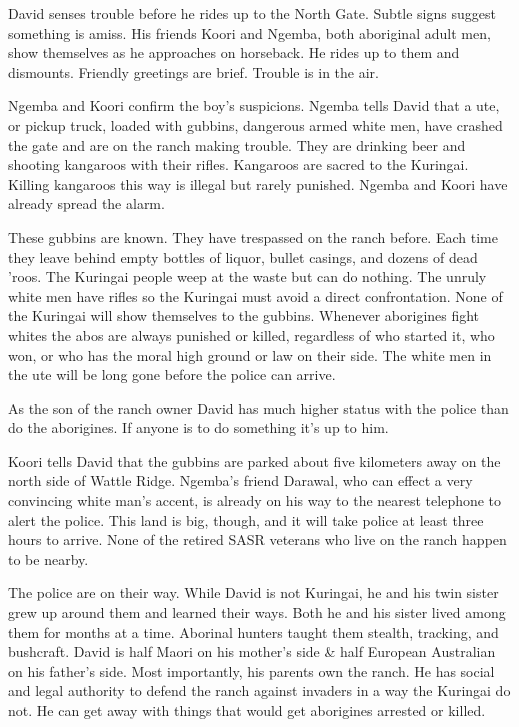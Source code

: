 David senses trouble before he rides up to the North Gate.  Subtle signs suggest something is amiss.  His friends Koori and Ngemba, both aboriginal adult men, show themselves as he approaches on horseback.  He rides up to them and dismounts.  Friendly greetings are brief. Trouble is in the air.

Ngemba and Koori confirm the boy's suspicions. Ngemba tells David that a ute, or pickup truck, loaded with gubbins, dangerous armed white men, have crashed the gate and are on the ranch making trouble.  They are drinking beer and shooting kangaroos with their rifles. Kangaroos are sacred to the Kuringai.  Killing kangaroos this way is illegal but rarely punished. Ngemba and Koori have already spread the alarm.

These gubbins are known.  They have trespassed on the ranch before.  Each time they leave behind empty bottles of liquor, bullet casings, and dozens of dead 'roos.  The Kuringai people weep at the waste but can do nothing.  The unruly white men have rifles so the Kuringai must avoid a direct confrontation.  None of the Kuringai will show themselves to the gubbins.   Whenever aborigines fight whites the abos are always punished or killed, regardless of who started it, who won, or who has the moral high ground or law on their side.  The white men in the ute will be long gone before the police can arrive.

As the son of the ranch owner David has much higher status with the police than do the aborigines.  If anyone is to do something it's up to him.

Koori tells David that the gubbins are parked about five kilometers away on the north side of Wattle Ridge. Ngemba's friend Darawal, who can effect a very convincing white man's accent, is already on his way to the nearest telephone to alert the police.  This land is big, though, and it will take police at least three hours to arrive.  None of the retired SASR veterans who live on the ranch happen to be nearby.

The police are on their way.   While David is not Kuringai, he and his twin sister grew up around them and learned their ways. Both he and his sister lived among them for months at a time.  Aborinal hunters taught them stealth, tracking, and bushcraft.  David is half Maori on his mother's side \& half European Australian on his father's side.  Most importantly, his parents own the ranch.  He has social and legal authority to defend the ranch against invaders in a way the Kuringai do not.  He can get away with things that would get aborigines arrested or killed.


